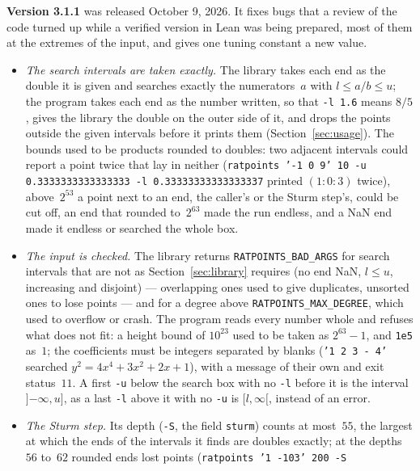 \documentclass[12pt,a4paper,oneside]{amsart}
\begin{document}
\textbf{Version 3.1.1} was released October 9, 2026. It fixes bugs that a
review of the code turned up while a verified version in Lean was being
prepared, most of them at the extremes of the input, and gives one tuning
constant a new value.
\begin{itemize}
  \item \emph{The search intervals are taken exactly.} The library takes each
        end as the double it is given and searches exactly the numerators~$a$
        with $l \le a/b \le u$; the program takes each end as the number
        written, so that \verb+-l 1.6+ means $8/5$, gives the library the
        double on the outer side of it, and drops the points outside the given
        intervals before it prints them (Section~\ref{sec:usage}). The bounds
        used to be products rounded to doubles: two adjacent intervals could
        report a point twice that lay in neither (\texttt{ratpoints '-1 0 9'
        10 -u 0.3333333333333333 -l 0.33333333333333337} printed $(1:0:3)$
        twice), above~$2^{53}$ a point next to an end, the caller's or the
        Sturm step's, could be cut off, an end that rounded to~$2^{63}$ made
        the run endless, and a NaN end made it endless or searched the whole
        box.
  \item \emph{The input is checked.} The library returns
        \texttt{RATPOINTS\_BAD\_ARGS} for search intervals that are not as
        Section~\ref{sec:library} requires (no end NaN, $l \le u$, increasing
        and disjoint) --- overlapping ones used to give duplicates, unsorted
        ones to lose points --- and for a degree above
        \texttt{RATPOINTS\_MAX\_DEGREE}, which used to overflow or crash. The
        program reads every number whole and refuses what does not fit: a
        height bound of $10^{23}$ used to be taken as $2^{63}-1$, and
        \texttt{1e5} as~$1$; the coefficients must be integers separated by
        blanks (\texttt{'1 2 3 - 4'} searched $y^2 = 4x^4 + 3x^2 + 2x + 1$),
        with a message of their own and exit status~$11$. A first \verb+-u+
        below the search box with no \verb+-l+ before it is the interval
        $]{-\infty}, u]$, as a last \verb+-l+ above it with no \verb+-u+ is
        $[l, \infty[$, instead of an error.
  \item \emph{The Sturm step.} Its depth (\verb+-S+, the field
        \texttt{sturm}) counts at most~$55$, the largest at which the ends of
        the intervals it finds are doubles exactly; at the depths $56$
        to~$62$ rounded ends lost points (\texttt{ratpoints '1 -103' 200 -S
}
\end{itemize}
\end{document}
